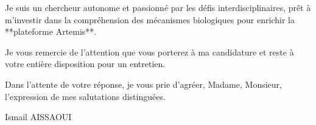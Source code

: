 \documentclass[11pt,a4paper]{article}
\begin{document}
Je suis un chercheur autonome et passionné par les défis interdisciplinaires, prêt à m'investir dans la compréhension des mécanismes biologiques pour enrichir la **plateforme Artemis**.

Je vous remercie de l'attention que vous porterez à ma candidature et reste à votre entière disposition pour un entretien.

Dans l'attente de votre réponse, je vous prie d'agréer, Madame, Monsieur, l'expression de mes salutations distinguées.

\bigskip

\noindent Ismail AISSAOUI
\end{document}

